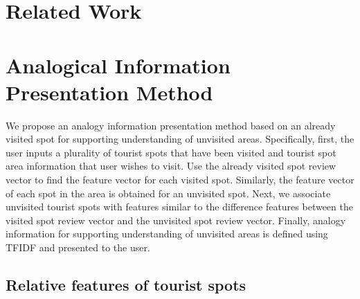 \documentclass[journal]{IAENGtran}
\begin{document}
\section{Related Work}
\label{sec:Related Work}


\section{Analogical Information Presentation Method}
\label{sec:Analogical Information Presentation Method}
We propose an analogy information presentation method based on an already visited spot for supporting understanding of unvisited areas.
Specifically, first, the user inputs a plurality of tourist spots that have been visited and tourist spot area information that user wishes to visit.
Use the already visited spot review vector to find the feature vector for each visited spot.
Similarly, the feature vector of each spot in the area is obtained for an unvisited spot.
Next, we associate unvisited tourist spots with features similar to the difference features between the visited spot review vector and the unvisited spot review vector.
Finally, analogy information for supporting understanding of unvisited areas is defined using TFIDF and presented to the user.

\subsection{Relative features of tourist spots}
\label{subsec:Relative features of tourist spots}
\end{document}
